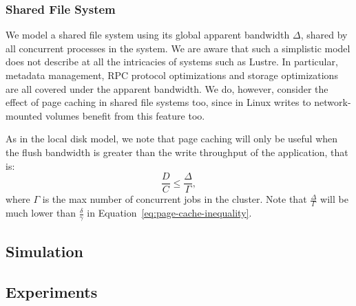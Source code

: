 \documentclass{IEEEtran}
\newcommand{\todo}[1]{\marginpar{\parbox{18mm}{\flushleft\tiny\color{red}\textbf{TODO}:
      #1}}}
\begin{document}

\todo{How about reads?}

\subsubsection{Shared File System}

We model a shared file system using its global apparent bandwidth 
$\Delta$, shared by all concurrent processes in the system. We are 
aware that such a simplistic model does not describe at all the 
intricacies of systems such as Lustre. In particular, metadata 
management, RPC protocol optimizations and storage optimizations are 
all covered under the apparent bandwidth. We do, however, consider the 
effect of page caching in shared file systems too, since in Linux 
writes to network-mounted volumes benefit from this feature too.

As in the local disk model, we note that page caching will only be 
useful when the flush bandwidth is greater than the write throughput of 
the application, that is:
\begin{equation}
\frac{D}{C} \leq \frac{\Delta}{\Gamma}, \label{eq:page-cache-sharedfs}
\end{equation}
where $\Gamma$ is the max number of concurrent jobs in the cluster. 
Note that $\frac{\Delta}{\Gamma}$ will be much lower than 
$\frac{\delta}{\gamma}$ in Equation~\ref{eq:page-cache-inequality}.     


\subsection{Simulation} %



\subsection{Experiments} %
\end{document}
